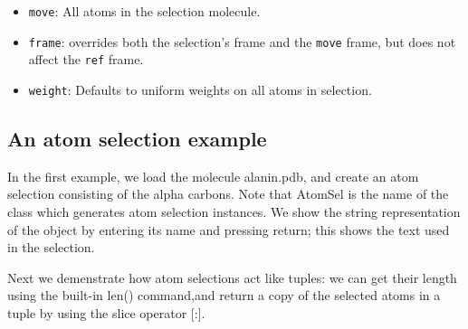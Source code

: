 \begin{itemize}
{\begin{itemize}
{Finds the transformation that aligns the atoms in the selection with the 
atoms in {\tt ref}, with optional weights {\tt weight}, and applies this 
transformation to the atoms in {\tt move}.  The following default values
for all arguments are provided:
\begin{itemize}
\item {\tt ref}: Same molecule and atoms as selection, but always using the
first timestep in the molecule.
\item {\tt move}: All atoms in the selection molecule.
\item {\tt frame}: overrides both the selection's frame and the {\tt move}
frame, but does not affect the {\tt ref} frame.
\item {\tt weight}: Defaults to uniform weights on all atoms in selection.
\end{itemize}
}

first timestep in the molecule.
\item {\tt move}: All atoms in the selection molecule.
\item {\tt frame}: overrides both the selection's frame and the {\tt move}
frame, but does not affect the {\tt ref} frame.
\item {\tt weight}: Defaults to uniform weights on all atoms in selection.
\end{itemize}
}


\end{itemize}

\subsection{An atom selection example}

In the first example, we load the molecule alanin.pdb, and create an atom
selection consisting of the alpha carbons.  Note that AtomSel is the name
of the class which generates atom selection instances.  We show the string 
representation of the object by entering its name and pressing return; this 
shows the text used in the selection.

Next we demenstrate how atom selections act like tuples: we can get their
length using the built-in len() command,and return a copy of the selected 
atoms in a tuple by using the slice operator [:].  

